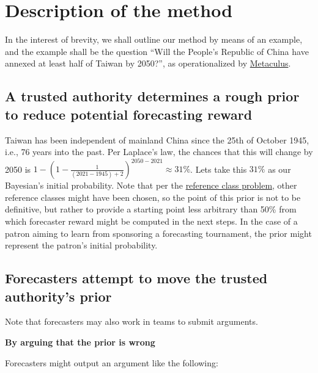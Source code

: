 \documentclass[]{article}
\begin{document}
\hypertarget{description-of-the-method}{%
\section{Description of the method}\label{description-of-the-method}}

In the interest of brevity, we shall outline our method by means of an
example, and the example shall be the question ``Will the People's
Republic of China have annexed at least half of Taiwan by 2050?'', as
operationalized by
\href{https://www.metaculus.com/questions/5320/chinese-annexation-of-most-of-taiwan-by-2050/}{Metaculus}.

\hypertarget{a-trusted-authority-determines-a-rough-prior-to-reduce-potential-forecasting-reward}{%
\subsection{A trusted authority determines a rough prior to reduce
potential forecasting
reward}\label{a-trusted-authority-determines-a-rough-prior-to-reduce-potential-forecasting-reward}}

Taiwan has been independent of mainland China since the 25th of October
1945, i.e., 76 years into the past. Per Laplace's law, the chances that
this will change by 2050 is
\(1-(1-\frac{1}{(2021-1945)+2})^{2050-2021} \approx 31\%\). Lets take
this \(31\%\) as our Bayesian's initial probability. Note that per the
\href{https://en.wikipedia.org/wiki/Reference_class_problem}{reference
class problem}, other reference classes might have been chosen, so the
point of this prior is not to be definitive, but rather to provide a
starting point less arbitrary than 50\% from which forecaster reward
might be computed in the next steps. In the case of a patron aiming to
learn from sponsoring a forecasting tournament, the prior might
represent the patron's initial probability.

\hypertarget{forecasters-attempt-to-move-the-trusted-authoritys-prior}{%
\subsection{Forecasters attempt to move the trusted authority's
prior}\label{forecasters-attempt-to-move-the-trusted-authoritys-prior}}

Note that forecasters may also work in teams to submit arguments.

\textbf{By arguing that the prior is wrong}

Forecasters might output an argument like the following:
\end{document}
